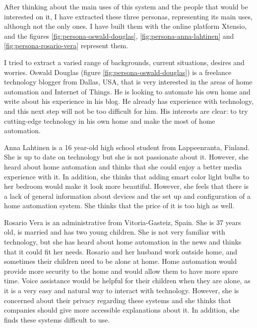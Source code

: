 After thinking about the main uses of this system and the people that would be interested on it, I have extracted these three personas, 
representing its main uses, although not the only ones. I have built them with the online platform Xtensio, and the figures
\ref{fig:persona-oswald-douglas}, \ref{fig:persona-anna-lahtinen} and \ref{fig:persona-rosario-vera} represent them.

I tried to extract a varied range of backgrounds, current situations, desires and worries. Oswald Douglas (figure 
\ref{fig:persona-oswald-douglas}) is a freelance technology blogger from Dallas, USA, that is very interested in the areas of home 
automation and Internet of Things. He is looking to automate his own home and write about his experience in his blog. He already has 
experience with technology, and this next step will not be too difficult for him. His interests are clear: to try cutting-edge technology 
in his own home and make the most of home automation.

Anna Lahtinen is a 16 year-old high school student from Lappeenranta, Finland. She is up to date on technology but she is not passionate 
about it. However, she heard about home automation and thinks that she could enjoy a better media experience with it. In addition, she 
thinks that adding smart color light bulbs to her bedroom would make it look more beautiful. However, she feels that there is a lack
of general information about devices and the set up and configuration of a home automation system. She thinks that the price
of it is too high as well.

Rosario Vera is an administrative from Vitoria-Gasteiz, Spain. She is 37 years old, is married and has two young children. She is not 
very familiar with technology, but she has heard about home automation in the news and thinks that it could fit her needs. Rosario
and her husband work outside home, and sometimes their children need to be alone at home. Home automation would provide more security
to the home and would allow them to have more spare time. Voice assistance would be helpful for their children when they are alone,
as it is a very easy and natural way to interact with technology. However, she is concerned about their privacy regarding these systems
and she thinks that companies should give more accessible explanations about it. In addition, she finds these systems difficult to use.

